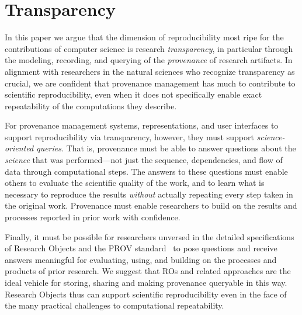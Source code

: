 \section{Transparency}\label{sec-transparency}

In this paper we argue that the dimension of reproducibility most ripe
for the contributions of computer science is research
\emph{transparency}, in particular through the modeling, recording,
and querying of the \emph{provenance} of research artifacts.  In
alignment with researchers in the natural sciences who recognize
transparency as crucial, we are confident that provenance management
has much to contribute to scientific reproducibility, even when it
does not specifically enable exact repeatability of the computations
they describe.

For provenance management systems, representations, and user interfaces to support reproducibility via transparency,
	however, they must support \emph{science-oriented queries}.
That is, provenance must be able to answer questions about the \emph{science} that was performed---not just the
	sequence, dependencies, and flow of data through computational steps.
The answers to these questions must enable others to evaluate the scientific quality of the work, and to learn what is necessary to
	reproduce the results \emph{without} actually repeating every step taken in the original work.
Provenance must enable researchers to build on the results and processes reported in prior work with confidence.

Finally, it must be possible for researchers unversed in the detailed
specifications of Research Objects and the PROV
standard~\cite{groth2013provoverviewa} to pose questions and receive
answers meaningful for evaluating, using, and building on the
processes and products of prior research.  We suggest that ROs and
related approaches are the ideal vehicle for storing, sharing and
making provenance queryable in this way.  Research Objects thus can
support scientific reproducibility even in the face of the many
practical challenges to computational repeatability.


